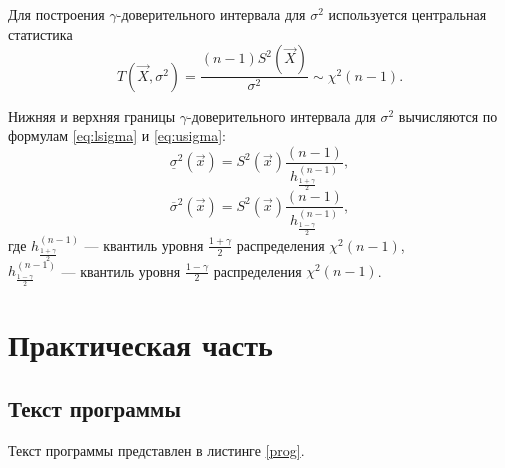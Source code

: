 Для построения $\gamma$-доверительного интервала для $\sigma^2$ используется центральная статистика
\begin{equation*}
	T(\vec{X}, \sigma^2) = \frac{(n - 1)S^2(\vec{X})}{\sigma^2} \sim \chi^2(n - 1).
\end{equation*}

Нижняя и верхняя границы $\gamma$-доверительного интервала для $\sigma^2$ вычисляются по формулам \eqref{eq:lsigma} и \eqref{eq:usigma}:
\begin{equation}
	\label{eq:lsigma}
	\underline{\sigma}^2(\vec{x}) = S^2(\vec{x})\frac{(n - 1)}{h_{\frac{1+\gamma}{2}}^{(n-1)}},
\end{equation}
\begin{equation}
	\label{eq:usigma}
	\overline{\sigma}^2(\vec{x}) = S^2(\vec{x})\frac{(n - 1)}{h_{\frac{1-\gamma}{2}}^{(n-1)}},
\end{equation}
\noindent
где $h_{\frac{1+\gamma}{2}}^{(n-1)}$ --- квантиль уровня $\frac{1+\gamma}{2}$ распределения $\chi^2(n - 1)$, \\
$h_{\frac{1-\gamma}{2}}^{(n-1)}$ --- квантиль уровня $\frac{1-\gamma}{2}$ распределения $\chi^2(n - 1)$.

\chapter{Практическая часть}
\section{Текст программы}
Текст программы представлен в листинге \ref{prog}.

